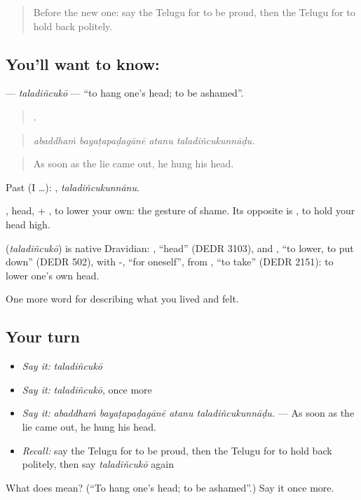 \label{lesson:TE-C498-taladincuko}



\begin{quote}
Before the new one: say the Telugu for to be proud, then the Telugu for to hold back politely.
\end{quote}

\subsection*{You'll want to know: }
\textbf{} — \emph{taladiñcukō} — \textquotedblleft{}to hang one's head; to be ashamed\textquotedblright{}.

\begin{quote}
   .
\end{quote}

\begin{quote}
\emph{abaddhaṁ bayaṭapaḍagānē atanu taladiñcukunnāḍu.}
\end{quote}

\begin{quote}
As soon as the lie came out, he hung his head.
\end{quote}

Past (I …): , \emph{taladiñcukunnānu}.

, head, + , to lower your own: the gesture of shame. Its opposite is , to hold your head high.

\begin{cousinweb}
\textbf{} (\emph{taladiñcukō}) is native Dravidian: , \textquotedblleft{}head\textquotedblright{} (DEDR 3103), and , \textquotedblleft{}to lower, to put down\textquotedblright{} (DEDR 502), with -, \textquotedblleft{}for oneself\textquotedblright{}, from , \textquotedblleft{}to take\textquotedblright{} (DEDR 2151): to lower one's own head.
\end{cousinweb}

\begin{grammarlens}[title={What you've built}]
One more word for describing what you lived and felt.
\end{grammarlens}

\subsection*{Your turn}
\begin{itemize}
\raggedright
  \item \emph{Say it:} \emph{taladiñcukō}
  \item \emph{Say it:} \emph{taladiñcukō}, once more
  \item \emph{Say it:} \emph{abaddhaṁ bayaṭapaḍagānē atanu taladiñcukunnāḍu.} — As soon as the lie came out, he hung his head.
  \item \emph{Recall:} say the Telugu for to be proud, then the Telugu for to hold back politely, then say \emph{taladiñcukō} again
\end{itemize}

\begin{tcolorbox}[breakable,colback=teal!4,colframe=teal!35!black,title={Before you move on}]
What does  mean? (\textquotedblleft{}To hang one's head; to be ashamed\textquotedblright{}.) Say it once more.
\end{tcolorbox}
